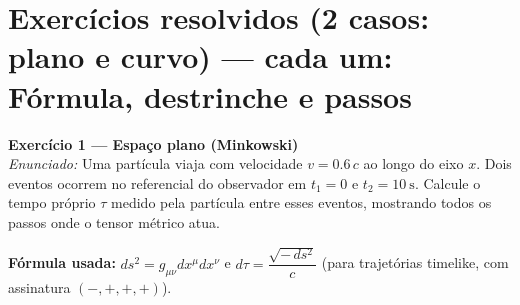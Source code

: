 \documentclass[11pt]{article}
\begin{document}
\section{Exercícios resolvidos (2 casos: plano e curvo) --- cada um: Fórmula, destrinche e passos}

\vspace{6pt}
\noindent\textbf{Exercício 1 — Espaço plano (Minkowski)}\\
\textit{Enunciado:} Uma partícula viaja com velocidade \(v=0.6\,c\) ao longo do eixo \(x\). Dois eventos ocorrem no referencial do observador em $t_1=0$ e $t_2=10\ \mathrm{s}$. Calcule o tempo próprio $\tau$ medido pela partícula entre esses eventos, mostrando todos os passos onde o tensor métrico atua.

\medskip
\textbf{Fórmula usada:} \(ds^2 = g_{\mu\nu}dx^\mu dx^\nu\) e \(d\tau = \dfrac{\sqrt{-\,ds^2}}{c}\) (para trajetórias timelike, com assinatura $(-,+,+,+)$).
\end{document}

